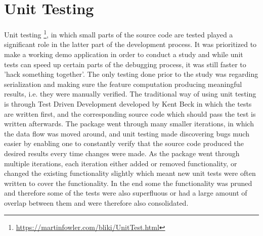 \section{Unit Testing}
Unit testing \footnote{\url{https://martinfowler.com/bliki/UnitTest.html}}, in which small parts of the source code are tested played a significant role in the latter part of the development process. It was prioritized to make a working demo application in order to conduct a study and while unit tests can speed up certain parts of the debugging process, it was still faster to 'hack something together'. The only testing done prior to the study was regarding serialization and making sure the feature computation producing meaningful results, i.e. they were manually verified. The traditional way of using unit testing is through Test Driven Development developed by Kent Beck \cite{beck-tdd} in which the tests are written first, and the corresponding source code which should pass the test is written afterwards. The package went through many smaller iterations, in which the data flow was moved around, and unit testing made discovering bugs much easier by enabling one to constantly verify that the source code produced the desired results every time changes were made. As the package went through multiple iterations, each iteration either added or removed functionality, or changed the existing functionality slightly which meant new unit tests were often written to cover the functionality. In the end some the functionality was pruned and therefore some of the tests were also superfluous or had a large amount of overlap between them and were therefore also consolidated. 

